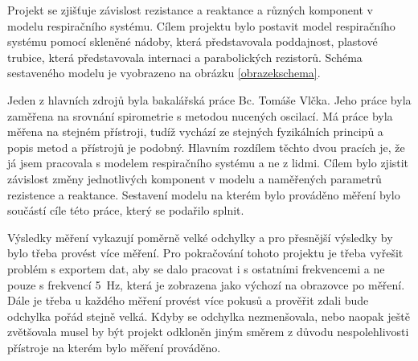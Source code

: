 Projekt se zjišťuje závislost rezistance a reaktance a různých komponent v modelu respiračního systému. 
Cílem projektu bylo postavit model respiračního systému pomocí skleněné nádoby, která představovala poddajnost, plastové trubice, která představovala internaci a parabolických rezistorů.  Schéma sestaveného modelu je vyobrazeno na obrázku \ref{obrazekschema}. 

Jeden z hlavních zdrojů byla bakalářská práce Bc. Tomáše Vlčka. Jeho práce byla zaměřena na srovnání spirometrie s metodou nucených oscilací. Má práce byla měřena na stejném přístroji, tudíž vychází ze stejných fyzikálních principů a popis metod a přístrojů je podobný. Hlavním rozdílem těchto dvou pracích je, že já jsem pracovala s modelem respiračního systému a ne z lidmi. Cílem bylo zjistit závislost změny jednotlivých komponent v modelu a naměřených parametrů rezistence a reaktance. Sestavení modelu na kterém bylo prováděno měření bylo součástí cíle této práce, který se podařilo splnit. 

Výsledky měření vykazují poměrně velké odchylky a pro přesnější výsledky by bylo třeba provést více měření. Pro pokračování tohoto projektu je třeba vyřešit problém s exportem dat, aby se dalo pracovat i s ostatními frekvencemi a ne pouze s frekvencí \SI{5}{Hz}, která je zobrazena jako výchozí na obrazovce po měření. Dále je třeba u každého měření provést více pokusů a prověřit zdali bude odchylka pořád stejně velká. Kdyby se odchylka nezmenšovala, nebo naopak ještě zvětšovala musel by být projekt odkloněn jiným směrem z důvodu nespolehlivosti přístroje na kterém bylo měření prováděno. 
